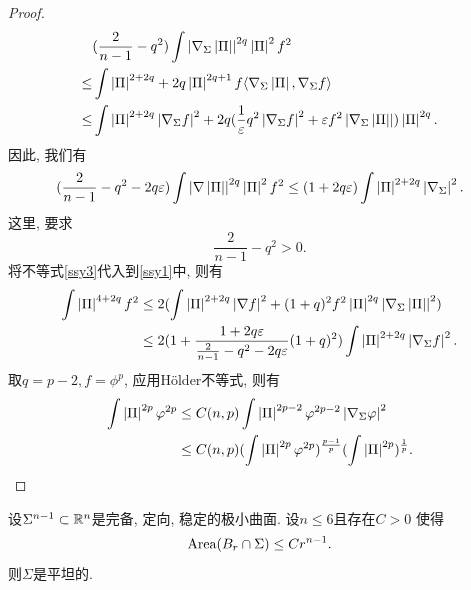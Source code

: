 \begin{proof}
    \begin{equation}
        \begin{split}
            &(\frac{2}{n-1}-q^2)\int\left | \nabla_\Sigma \left | {\Pi} \right | \right |^{2q} \left | {\Pi} \right |^2 f^2 \\
            \le & \int \left | {\Pi} \right |^{2+2q}+2q\left | {\Pi} \right |^{2q+1}f{\left < \nabla_\Sigma \left | {\Pi} \right |, \nabla_\Sigma f \right >} \\
            \le& \int \left | {\Pi} \right |^{2+2q}\left | \nabla_\Sigma f \right |^2 + 2q(\frac{1}{\varepsilon}q^2 \left | \nabla_\Sigma f \right |^2 + \varepsilon f^2 \left | \nabla_\Sigma \left | {\Pi} \right | \right |)\left | {\Pi} \right |^{2q}. 
        \end{split}
    \end{equation}
    因此, 我们有
    \begin{equation} \label{ssy3}
        (\frac{2}{n-1}-q^2-2q\varepsilon) \int \left | \nabla \left | {\Pi} \right | \right |^{2q} \left | {\Pi} \right |^2 f^2 \le (1+2q\varepsilon)\int \left | {\Pi} \right |^{2+2q}\left | \nabla_\Sigma \right |^2.
    \end{equation}
    这里, 要求
    \begin{equation}
        \frac{2}{n-1}-q^2 >0.
    \end{equation}
    将不等式\eqref{ssy3}代入到\eqref{ssy1}中, 则有
    \begin{equation}
        \begin{split}
            \int \left | {\Pi} \right |^{4+2q}f^2 &\le 2(\int \left | {\Pi} \right |^{2+2q}\left | \nabla f \right |^2 + (1+q)^2f^2\left | {\Pi} \right |^{2q}\left | \nabla_\Sigma \left | {\Pi} \right | \right |^2) \\
            & \le 2(1+\frac{1+2q\varepsilon}{\frac{2}{n-1}-q^2-2q\varepsilon}(1+q)^2)\int \left | {\Pi} \right |^{2+2q}\left | \nabla_\Sigma f \right |^2.
        \end{split}
    \end{equation}
    取$q=p-2, f=\phi^p$, 应用H\"older不等式, 则有
    \begin{equation}
        \begin{split}
            \int \left | {\Pi} \right |^{2p} \varphi^{2p} &\le C(n,p)\int \left | {\Pi} \right |^{2p-2}\varphi^{2p-2}\left | \nabla_{\Sigma}\varphi \right |^2 \\
            & \le C(n,p)(\int\left | {\Pi} \right |^{2p}\varphi^{2p})^\frac{p-1}{p}(\int\left | {\Pi} \right |^{2p})^{\frac{1}{p}}.
        \end{split}
    \end{equation}
\end{proof}
\begin{theorem}
    设$\Sigma^{n-1} \subset \mathbb{R}^n$是完备, 定向, 稳定的极小曲面. 设$n \le 6$且存在$C>0$ 使得
    \begin{equation}
        \text{Area}(B_r\cap \Sigma) \le Cr^{n-1}.
    \end{equation}
    则$\Sigma$是平坦的.
\end{theorem}
